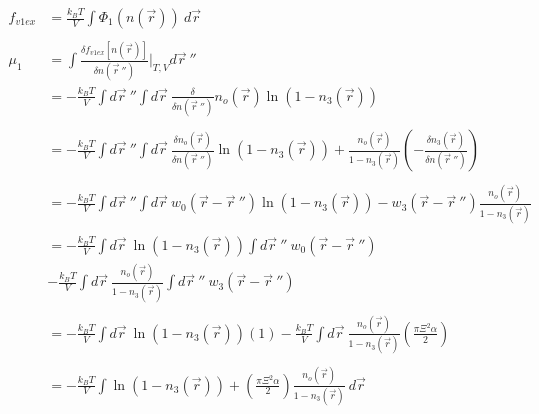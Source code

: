 \documentclass[double,12pt]{beavtex}
\begin{document}
\begin{align}
    f_{v1ex} &= \frac{k_BT}{V}\int \Phi_1(n(\vec r))~d\vec r \\ \nonumber\\
    \mu_1 &= \int \frac{\delta f_{v1ex}[n(\vec r)]}{\delta n(\vec r~'')}
    \bigg|_{T,V} d\vec r~'' \\
        &= -\frac{k_BT}{V} \int d\vec r~'' \int d\vec r~ \frac{\delta}
        {\delta n(\vec r~'')}n_o(\vec r)\ln(1-n_3(\vec r)) \\ \nonumber\\
%
        &= -\frac{k_BT}{V}\int d\vec r~''\int d\vec r~\frac{\delta n_o(\vec r)}
        {\delta n(\vec r~'')}\ln(1-n_3(\vec r))+\frac{n_o(\vec r)}
          {1-n_3(\vec r)}\left(-\frac{\delta n_3(\vec r)}{\delta n(\vec r~'')}
          \right) \\ \nonumber\\
%
        &= -\frac{k_BT}{V} \int d\vec r~'' \int d\vec r~w_0(\vec r - \vec r~'')
          \ln(1-n_3(\vec r)) - w_3(\vec r - \vec r~'')\frac{n_o(\vec r)}
          {1-n_3(\vec r)} \\ \nonumber\\
%
        &= -\frac{k_BT}{V} \int d\vec r~\ln(1-n_3(\vec r)) \int d \vec r~''  
          ~w_0(\vec r - \vec r~'') \nonumber\\
        &- \frac{k_BT}{V} \int d\vec r ~\frac{n_o(\vec r)}{1-n_3(\vec r)} 
          \int d \vec r~''~w_3(\vec r - \vec r~'')  \\ \\
%
        &= -\frac{k_BT}{V} \int d\vec r ~\ln(1-n_3(\vec r))(1)
          - \frac{k_BT}{V} \int d\vec r ~\frac{n_o(\vec r)}{1-n_3(\vec r)}
          \left(\frac{\pi\Xi^2\alpha}{2}\right) \\ \\
%
        &= -\frac{k_BT}{V}\int\ln(1-n_3(\vec r))+\left(
        \frac{\pi\Xi^2\alpha}{2}\right)\frac{n_o(\vec r)}{1-n_3(\vec r)}~d\vec r
\end{align}
\end{document}

